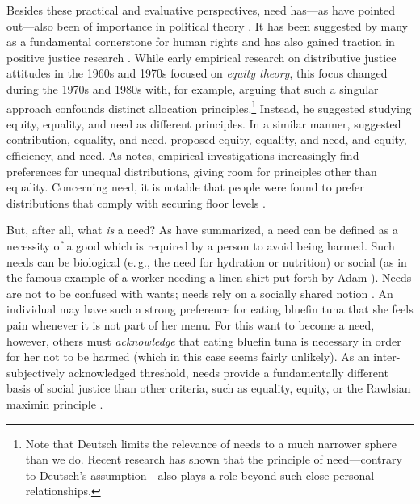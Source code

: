 \documentclass[12pt]{scrartcl}
\begin{document}
Besides these practical and evaluative perspectives, need has---as \cite{bauer_need_2022} have pointed out---also been of importance in political theory \citep{dean_translation_2013,doyal_theory_1984,nussbaum_human_1992,weale_political_1984}.
It has been suggested by many as a fundamental cornerstone for human rights \citep[e.\,g.,][]{brock_needs_2005,gasper_needs_2005,renzo_human_2015} and has also gained traction in positive justice research \citep[for a summary of some recent work, see, e.\,g.,][]{miller_needs-based_2020}.
While early empirical research on distributive justice attitudes in the 1960s and 1970s focused on \textit{equity theory}, this focus changed during the 1970s and 1980s with, for example, \cite{deutsch_equity_1975} arguing that such a singular approach confounds distinct allocation principles.\footnote{Note that Deutsch limits the relevance of needs to a much narrower sphere than we do. Recent research has shown that the principle of need---contrary to Deutsch's assumption---also plays a role beyond such close personal relationships.}
Instead, he suggested studying equity, equality, and need as different principles.
In a similar manner, \cite{schwinger_just_1980} suggested contribution, equality, and need.
\cite{wagstaff_equity_1994} proposed equity, equality, and need, and \cite{konow_fair_2001} equity, efficiency, and need.
As \cite{konow_is_2009} notes, empirical investigations increasingly find preferences for unequal distributions, giving room for principles other than equality.
Concerning need, it is notable that people were found to prefer distributions that comply with securing floor levels \citep[e.\,g.][]{ahlert_thresholds_2012,frohlich_choosing_1992,frohlich_choices_1987}.

But, after all, what \textit{is} a need?
As \cite{bauer_need_2022} have summarized, a need can be defined as a necessity of a good which is required by a person to avoid being harmed.
Such needs can be biological (e.\,g., the need for hydration or nutrition) or social (as in the famous example of a worker needing a linen shirt put forth by Adam \citealt{smith_wealth_1979}).
Needs are not to be confused with wants; needs rely on a socially shared notion \citep{miller_principles_1999}.
An individual may have such a strong preference for eating bluefin tuna that she feels pain whenever it is not part of her menu.
For this want to become a need, however, others must \textit{acknowledge} that eating bluefin tuna is necessary in order for her not to be harmed (which in this case seems fairly unlikely).
As an inter-subjectively acknowledged threshold, needs provide a fundamentally different basis of social justice than other criteria, such as equality, equity, or the Rawlsian maximin principle \citep[for philosophical overviews on need-based justice, see][]{miller_needs-based_2020,siebel_need_2020}.
\end{document}
